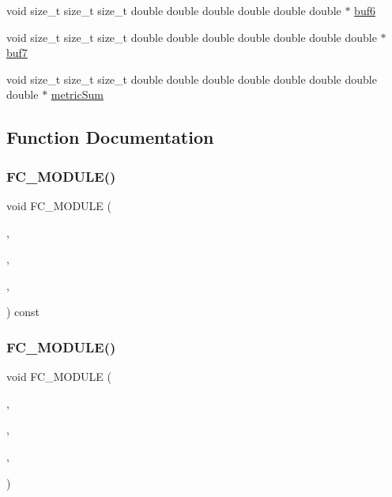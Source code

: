 \begin{DoxyCompactItemize}
\item 
void size\+\_\+t size\+\_\+t size\+\_\+t double double double double double double $\ast$ \hyperlink{SpecialKernels_8H_a1ecfdf27819102af6ccae0762e607308}{buf6}
\item 
void size\+\_\+t size\+\_\+t size\+\_\+t double double double double double double double $\ast$ \hyperlink{SpecialKernels_8H_a8562dabe2a78d45593422b8b1e4ef513}{buf7}
\item 
void size\+\_\+t size\+\_\+t size\+\_\+t double double double double double double double double $\ast$ \hyperlink{SpecialKernels_8H_a0340a724362a31a98b845deab71cda83}{metric\+Sum}
\end{DoxyCompactItemize}


\subsection{Function Documentation}
\hypertarget{SpecialKernels_8H_a54e5444b63823301c4a65fd23d20676f}{}\label{SpecialKernels_8H_a54e5444b63823301c4a65fd23d20676f} 
\subsubsection{\texorpdfstring{F\+C\+\_\+\+M\+O\+D\+U\+L\+E()}{FC\_MODULE()}\hspace{0.1cm}{\footnotesize\ttfamily [1/4]}}
{\footnotesize\ttfamily void F\+C\+\_\+\+M\+O\+D\+U\+LE (\begin{DoxyParamCaption}\item[{special}]{,  }\item[{veclen}]{,  }\item[{S\+P\+E\+C\+I\+AL}]{,  }\item[{V\+E\+C\+L\+EN}]{ }\end{DoxyParamCaption}) const}

\hypertarget{SpecialKernels_8H_a3ea21f4744cf074f90c430b90c4ad2a1}{}\label{SpecialKernels_8H_a3ea21f4744cf074f90c430b90c4ad2a1} 
\subsubsection{\texorpdfstring{F\+C\+\_\+\+M\+O\+D\+U\+L\+E()}{FC\_MODULE()}\hspace{0.1cm}{\footnotesize\ttfamily [2/4]}}
{\footnotesize\ttfamily void F\+C\+\_\+\+M\+O\+D\+U\+LE (\begin{DoxyParamCaption}\item[{special}]{,  }\item[{determinant3x3}]{,  }\item[{S\+P\+E\+C\+I\+AL}]{,  }\item[{D\+E\+T\+E\+R\+M\+I\+N\+A\+N\+T3\+X3}]{ }\end{DoxyParamCaption})}

